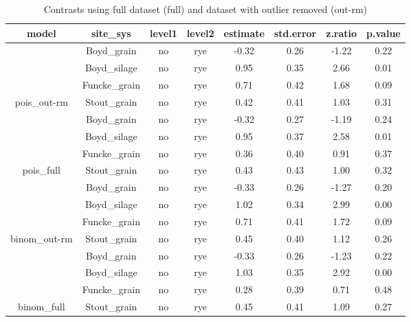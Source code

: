 \documentclass[
]{article}
\begin{document}
\begin{table}[H]

\caption{\label{tab:contrasts}Contrasts using full dataset (full) and dataset with outlier removed (out-rm)}
\centering
\begin{tabular}[t]{cccccccc}
\toprule
model & site\_sys & level1 & level2 & estimate & std.error & z.ratio & p.value\\
\midrule
\rowcolor{gray!6}   & Boyd\_grain & no & rye & -0.32 & 0.26 & -1.22 & 0.22\\

 & Boyd\_silage & no & rye & 0.95 & 0.35 & 2.66 & 0.01\\

\rowcolor{gray!6}   & Funcke\_grain & no & rye & 0.71 & 0.42 & 1.68 & 0.09\\

\multirow{-4}{*}{\centering\arraybackslash pois\_out-rm} & Stout\_grain & no & rye & 0.42 & 0.41 & 1.03 & 0.31\\
\cmidrule{1-8}
\rowcolor{gray!6}   & Boyd\_grain & no & rye & -0.32 & 0.27 & -1.19 & 0.24\\

 & Boyd\_silage & no & rye & 0.95 & 0.37 & 2.58 & 0.01\\

\rowcolor{gray!6}   & Funcke\_grain & no & rye & 0.36 & 0.40 & 0.91 & 0.37\\

\multirow{-4}{*}{\centering\arraybackslash pois\_full} & Stout\_grain & no & rye & 0.43 & 0.43 & 1.00 & 0.32\\
\cmidrule{1-8}
\rowcolor{gray!6}   & Boyd\_grain & no & rye & -0.33 & 0.26 & -1.27 & 0.20\\

 & Boyd\_silage & no & rye & 1.02 & 0.34 & 2.99 & 0.00\\

\rowcolor{gray!6}   & Funcke\_grain & no & rye & 0.71 & 0.41 & 1.72 & 0.09\\

\multirow{-4}{*}{\centering\arraybackslash binom\_out-rm} & Stout\_grain & no & rye & 0.45 & 0.40 & 1.12 & 0.26\\
\cmidrule{1-8}
\rowcolor{gray!6}   & Boyd\_grain & no & rye & -0.33 & 0.26 & -1.23 & 0.22\\

 & Boyd\_silage & no & rye & 1.03 & 0.35 & 2.92 & 0.00\\

\rowcolor{gray!6}   & Funcke\_grain & no & rye & 0.28 & 0.39 & 0.71 & 0.48\\

\multirow{-4}{*}{\centering\arraybackslash binom\_full} & Stout\_grain & no & rye & 0.45 & 0.41 & 1.09 & 0.27\\
\bottomrule
\end{tabular}
\end{table}
\end{document}
